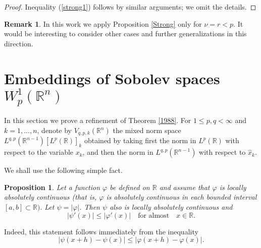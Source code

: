 \documentclass[12pt,twoside,reqno]{amsart}
\numberwithin{equation}{section}
\newtheorem{prop}[teo]{Proposition}
\theoremstyle{definition}
\newtheorem{rem}[teo]{Remark}
\numberwithin{equation}{section}
\def\R{\mathbb{R}}
\def\f{\varphi}
\begin{document}
\begin{proof}
 Inequality (\ref{strong1}) follows by similar arguments; we omit the details.

\end{proof}



\vskip 6pt
\begin{rem} In this work we apply Proposition \ref{Strong} only for $\nu=r<p$. It would be interesting to consider other cases and further generalizations in this direction.

\end{rem}

\section{ Embeddings of  Sobolev spaces $W_p^1(\R^n)$}


In this section we prove a refinement of Theorem \ref{1988}.
For $1\le p,q<\infty$ and $k=1,...,n$,  denote by  $V_{q,p,k}(\R^n)$ the mixed norm space
$L^{q,p}(\R^{n-1})[L^p(\R)]_k$
obtained by taking first the norm in $L^p(\R)$ with respect to the variable $x_k$, and then the norm in $L^{q,p}(\R^{n-1})$ with respect to $\widehat x_k.$

We shall use the following simple fact.
\begin{prop}\label{absolute}
Let a function $\f$ be defined on $\R$ and assume that $\f$ is locally absolutely continuous (that is, $\f$ is absolutely continuous in each bounded interval $[a,b]\subset \R).$ Let $\psi=|\f|$. Then $\psi$ also is locally absolutely continuous and
$$
|\psi'(x)|\le |\f'(x)| \quad\mbox{for almost}\quad x\in \R.
$$
\end{prop}

Indeed, this statement follows immediately from the inequality
$$
|\psi(x+h)-\psi(x)|\le |\f(x+h)-\f(x)|.
$$
\end{document}
